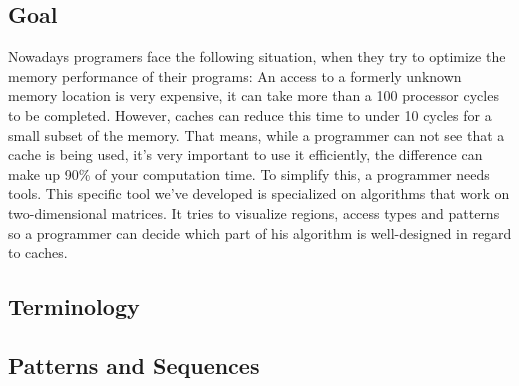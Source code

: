 \subsection{Goal}
Nowadays programers face the following situation, when they try to optimize the memory performance of their programs: An access to a formerly unknown memory location is very expensive, it can take more than a 100 processor cycles to be completed. However, caches can reduce this time to under 10 cycles for a small subset of the memory. That means, while a programmer can not see that a cache is being used, it's very important to use it efficiently, the difference can make up 90\% of your computation time.\newline
To simplify this, a programmer needs tools. This specific tool we've developed is specialized on algorithms that work on two-dimensional matrices. It tries to visualize regions, access types and patterns so a programmer can decide which part of his algorithm is well-designed in regard to caches.

\subsection{Terminology}


\subsection{Patterns and Sequences}

